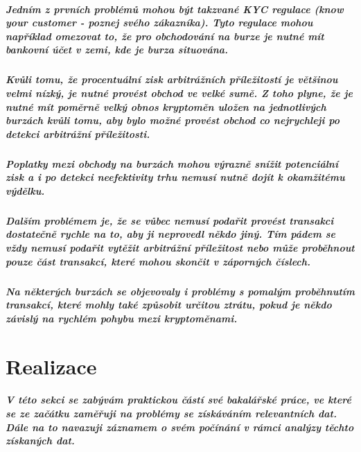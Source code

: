 \documentclass[thesis=B,czech]{FITthesis}[2019/03/21]
\begin{document}
\paragraph{
Jedním z prvních problémů mohou být takzvané KYC regulace (know your customer - poznej svého zákazníka). Tyto regulace mohou například omezovat to, že pro obchodování na burze je nutné mít bankovní účet v zemi, kde je burza situována.
}
\paragraph{
Kvůli tomu, že procentuální zisk arbitrážních příležitostí je většinou velmi nízký, je nutné provést obchod ve velké sumě. Z toho plyne, že je nutné mít poměrně velký obnos kryptoměn uložen na jednotlivých burzách kvůli tomu, aby bylo možné provést obchod co nejrychleji po detekci arbitrážní příležitosti. 
}
\paragraph{
Poplatky mezi obchody na burzách mohou výrazně snížit potenciální zisk a i po detekci neefektivity trhu nemusí nutně dojít k okamžitému výdělku.  
}
\paragraph{
Dalším problémem je, že se vůbec nemusí podařit provést transakci dostatečně rychle na to, aby ji neprovedl někdo jiný. Tím pádem se vždy nemusí podařit vytěžit arbitrážní příležitost nebo může proběhnout pouze část transakcí, které mohou skončit v záporných číslech.
}
\paragraph{
Na některých burzách se objevovaly i problémy s pomalým proběhnutím transakcí, které mohly také způsobit určitou ztrátu, pokud je někdo závislý na rychlém pohybu mezi kryptoměnami. \cite{finder}
}
\chapter{Realizace}
\paragraph{
V této sekci se zabývám praktickou částí své bakalářské práce, ve které se ze začátku zaměřuji na problémy se získáváním relevantních dat. Dále na to navazuji záznamem o svém počínání v rámci analýzy těchto získaných dat. 
}
\end{document}
